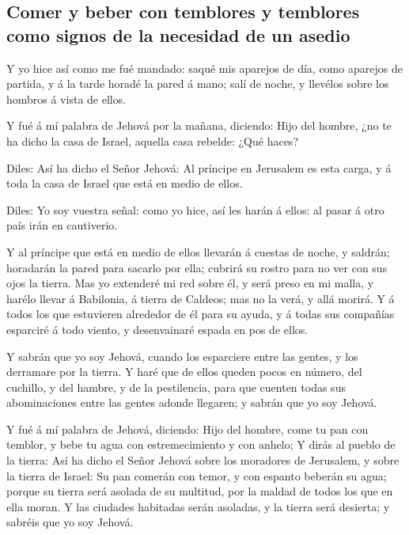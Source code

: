 \hypertarget{comer-y-beber-con-temblores-y-temblores-como-signos-de-la-necesidad-de-un-asedio}{%
\subsection{Comer y beber con temblores y temblores como signos de la
necesidad de un
asedio}\label{comer-y-beber-con-temblores-y-temblores-como-signos-de-la-necesidad-de-un-asedio}}

 Y yo hice así como me fué mandado: saqué mis aparejos de
día, como aparejos de partida, y á la tarde horadé la pared á mano; salí
de noche, y llevélos sobre los hombros á vista de ellos.

 Y fué á mí palabra de Jehová por la mañana, diciendo:
 Hijo del hombre, ¿no te ha dicho la casa de Israel, aquella
casa rebelde: ¿Qué haces?

 Diles: Así ha dicho el Señor Jehová: Al príncipe en
Jerusalem es esta carga, y á toda la casa de Israel que está en medio de
ellos.

 Diles: Yo soy vuestra señal: como yo hice, así les harán á
ellos: al pasar á otro país irán en cautiverio.

 Y al príncipe que está en medio de ellos llevarán á
cuestas de noche, y saldrán; horadarán la pared para sacarlo por ella;
cubrirá su rostro para no ver con sus ojos la tierra.  Mas
yo extenderé mi red sobre él, y será preso en mi malla, y harélo llevar
á Babilonia, á tierra de Caldeos; mas no la verá, y allá morirá.
 Y á todos los que estuvieren alrededor de él para su
ayuda, y á todas sus compañías esparciré á todo viento, y desenvainaré
espada en pos de ellos.

 Y sabrán que yo soy Jehová, cuando los esparciere entre
las gentes, y los derramare por la tierra.  Y haré que de
ellos queden pocos en número, del cuchillo, y del hambre, y de la
pestilencia, para que cuenten todas sus abominaciones entre las gentes
adonde llegaren; y sabrán que yo soy Jehová.

 Y fué á mí palabra de Jehová, diciendo:  Hijo
del hombre, come tu pan con temblor, y bebe tu agua con estremecimiento
y con anhelo;  Y dirás al pueblo de la tierra: Así ha dicho
el Señor Jehová sobre los moradores de Jerusalem, y sobre la tierra de
Israel: Su pan comerán con temor, y con espanto beberán su agua; porque
su tierra será asolada de su multitud, por la maldad de todos los que en
ella moran.  Y las ciudades habitadas serán asoladas, y la
tierra será desierta; y sabréis que yo soy Jehová.

